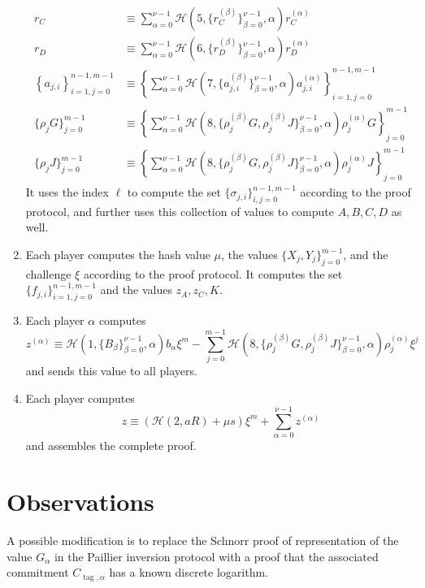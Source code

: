 \documentclass{article}
\newcommand{\hs}{\mathcal{H}}
\begin{document}
\begin{enumerate}
\begin{align*}
            r_C &\equiv \sum_{\alpha=0}^{\nu-1} \hs(5, \{r_C^{(\beta)}\}_{\beta=0}^{\nu-1}, \alpha) r_C^{(\alpha)} \\
            r_D &\equiv \sum_{\alpha=0}^{\nu-1} \hs(6, \{r_D^{(\beta)}\}_{\beta=0}^{\nu-1}, \alpha) r_D^{(\alpha)} \\
            \left\{a_{j,i}\right\}_{i=1,j=0}^{n-1,m-1} &\equiv \left\{\sum_{\alpha=0}^{\nu-1} \hs(7, \{a_{j,i}^{(\beta)}\}_{\beta=0}^{\nu-1}, \alpha) a_{j,i}^{(\alpha)}\right\}_{i=1,j=0}^{n-1,m-1} \\
            \{\rho_j G\}_{j=0}^{m-1} &\equiv \left\{\sum_{\alpha=0}^{\nu-1} \hs(8, \{\rho_j^{(\beta)}G, \rho_j^{(\beta)}J\}_{\beta=0}^{\nu-1}, \alpha) \rho_j^{(\alpha)}G\right\}_{j=0}^{m-1} \\
            \{\rho_j J\}_{j=0}^{m-1} &\equiv \left\{\sum_{\alpha=0}^{\nu-1} \hs(8, \{\rho_j^{(\beta)}G, \rho_j^{(\beta)}J\}_{\beta=0}^{\nu-1}, \alpha) \rho_j^{(\alpha)}J\right\}_{j=0}^{m-1}
        \end{align*}
        It uses the index $\ell$ to compute the set $\{\sigma_{j,i}\}_{i,j=0}^{n-1,m-1}$ according to the proof protocol, and further uses this collection of values to compute $A, B, C, D$ as well.
    \item Each player computes the hash value $\mu$, the values $\{X_j,Y_j\}_{j=0}^{m-1}$, and the challenge $\xi$ according to the proof protocol.
    It computes the set $\{f_{j,i}\}_{i=1,j=0}^{n-1,m-1}$ and the values $z_A, z_C, K$.
    \item Each player $\alpha$ computes $$z^{(\alpha)} \equiv \hs(1, \{B_\beta\}_{\beta=0}^{\nu-1},\alpha) b_\alpha \xi^m - \sum_{j=0}^{m-1} \hs(8, \{\rho_j^{(\beta)}G, \rho_j^{(\beta)}J\}_{\beta=0}^{\nu-1}, \alpha) \rho_j^{(\alpha)}\xi^j$$ and sends this value to all players.
    \item Each player computes $$z \equiv (\hs(2, aR) + \mu s)\xi^m + \sum_{\alpha=0}^{\nu-1} z^{(\alpha)}$$ and assembles the complete proof.
\end{enumerate}


\section{Observations}

A possible modification is to replace the Schnorr proof of representation of the value $G_\alpha$ in the Paillier inversion protocol with a proof that the associated commitment $C_{\operatorname{tag},\alpha}$ has a known discrete logarithm.
\end{document}
